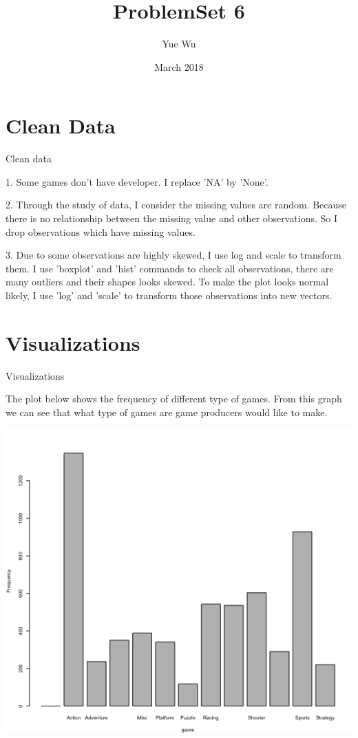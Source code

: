\documentclass{article}
\title{ProblemSet 6}
\author{Yue Wu}
\date{March 2018}
\begin{document}
\maketitle

\section{Clean Data}

Clean data

1. Some games don't have developer. I replace 'NA' by 'None'.

2. Through the study of data, I consider the missing values are random. Because there is no relationship between the missing value and other observations. So I drop observations which have missing values.

3. Due to some observations are highly skewed, I use log and scale to transform them.
I use 'boxplot' and 'hist' commands to check all observations, there are many outliers and their shapes looks skewed.
To make the plot looks normal likely, I use 'log' and 'scale' to transform those observations into new vectors.  


\section{Visualizations}

Visualizations

The plot below shows the frequency of different type of games. From this graph we can see that what type of games are game producers would like to make.

\includegraphics[scale=0.5]{PS6a_wu.png}
\end{document}
